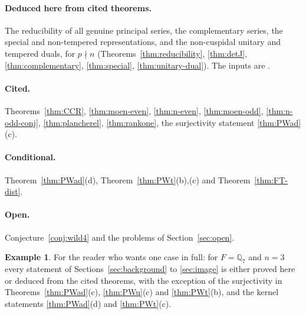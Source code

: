\documentclass[12pt,letterpaper]{article}
\numberwithin{equation}{section}
\theoremstyle{definition}
\newtheorem{example}[theorem]{Example}
\newcommand{\Q}{\mathbb Q}
\begin{document}
\paragraph{Deduced here from cited theorems.}  The reducibility of all genuine principal
series, the complementary series, the special and non-tempered representations, and the
non-cuspidal unitary and tempered duals, for $p\nmid n$
(Theorems~\ref{thm:reducibility}, \ref{thm:detJ}, \ref{thm:complementary},
\ref{thm:special}, \ref{thm:unitary-dual}).  The inputs are \cite{GS16,He25,BJ13,KS23}.

\paragraph{Cited.}  Theorems~\ref{thm:CCR}, \ref{thm:moen-even}, \ref{thm:n-even},
\ref{thm:moen-odd}, \ref{thm:n-odd-conj}, \ref{thm:plancherel}, \ref{thm:rankone}, the
surjectivity statement \ref{thm:PWad}(c).

\paragraph{Conditional.} Theorem~\ref{thm:PWad}(d), Theorem~\ref{thm:PWt}(b),(c) and Theorem~\ref{thm:FT-dist}.

\paragraph{Open.}  Conjecture~\ref{conj:wild4} and the problems of
Section~\ref{sec:open}.

\begin{example}\label{ex:summary}
For the reader who wants one case in full: for $F=\Q_7$ and $n=3$ every statement of
Sections~\ref{sec:background} to \ref{sec:image} is either proved here or deduced from the
cited theorems, with the exception of the surjectivity in
Theorems~\ref{thm:PWad}(c), \ref{thm:PWu}(c) and \ref{thm:PWt}(b), and the kernel statements
\ref{thm:PWad}(d) and \ref{thm:PWt}(c).
\end{example}

\end{document}
